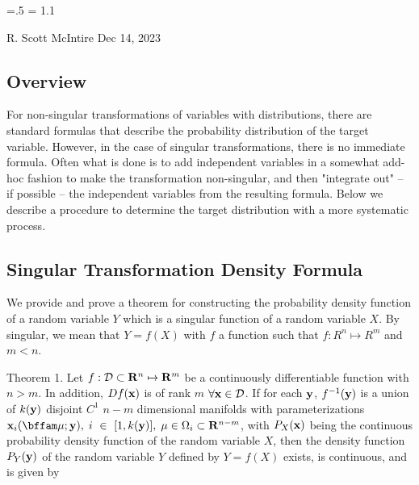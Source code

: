 

\parindent=0pt
\parskip=.5\baselineskip
\baselineskip = 1.1\baselineskip

\footline{\hss\tenrm\folio\hss}



{R. Scott McIntire} {Dec 14, 2023}

\subsection{Overview}
For non-singular transformations of variables with distributions, there 
are standard formulas that describe the probability distribution 
of the target variable. However, in the case of singular transformations,
there is no immediate formula. Often what is done is to add independent 
variables in a somewhat add-hoc fashion to make the transformation 
non-singular, and then "integrate out" -- if possible -- 
the independent variables from the resulting formula. 
Below we describe a procedure to determine the
target distribution with a more systematic process.

\subsection{Singular Transformation Density Formula}
We provide and prove a theorem for constructing the probability 
density function of a random variable $Y$ which is a singular function of a 
random variable $X$. By singular, we mean that $Y = f(X)$ with $f$ a function
such that $f: R^n \mapsto R^m$ and $m < n$. 

\proclaim Theorem 1. Let $f : {\cal D} \subset {\bf R}^n \mapsto {\bf R}^m$ be a continuously
          differentiable function with $n > m$. In addition,
          $Df({\bf x})$ is of rank $m$ $\forall {\bf x} \in {\cal D}$.
          If for each
          ${\bf y}$, $f^{-1}({\bf y})$ is a union of $k({\bf y})$ 
          disjoint $C^1$ $n-m$ dimensional manifolds with
          parameterizations ${\bf x}_i({\bffam \mu} ; {\bf y}), \;
          i~\in~[1,k({\bf y})], \; \mu \in \Omega_i \subset {\bf R}^{n-m}$,
          with $P_X({\bf x})$ being the continuous probability
          density function of the random variable $X$, then the 
          density function $P_Y({\bf y})$ of the random variable $Y$ 
          defined by $Y = f(X)$ exists, is continuous, and is given by


